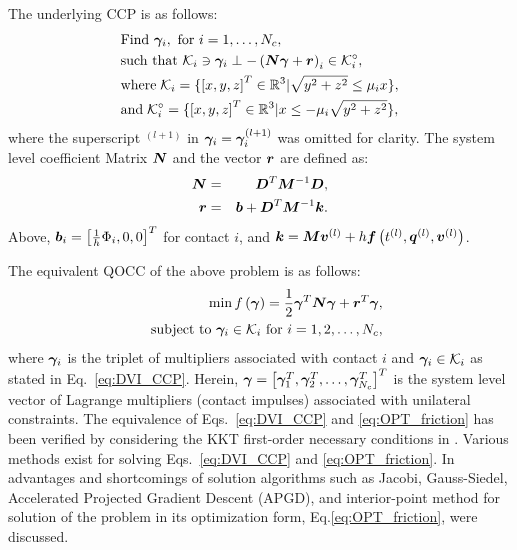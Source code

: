 The underlying CCP is as follows:
\begin{align}\label{eq:DVI_CCP}
&\text{Find } \boldsymbol{\gamma}_i, \text{ for } i=1,\ldots,N_c \nonumber, \\
&\text{such that } {\mathcal{K}}_i \ni \boldsymbol{\gamma}_i\perp -\left(\boldsymbol{N}\boldsymbol{\gamma}+\boldsymbol{r}\right)_i \in {\mathcal{K}}_i^\circ ,\\
&\text{where}\; {\mathcal{K}}_i=\{\left[x,y,z\right]^T \in \mathbb{R}^3 | \sqrt{y^2+z^2} \leq \mu_i x\} \nonumber,\\
&\text{and}\; {\mathcal{K}}_i^\circ=\{\left[x,y,z\right]^T \in \mathbb{R}^3 | x \leq -\mu_i\sqrt{y^2+z^2}\}, \nonumber
\end{align}
where the superscript $^{(l+1)}$ in $\boldsymbol{\gamma}_i=\boldsymbol{\gamma}_i^{(l+1)}$ was omitted for clarity. The system level coefficient Matrix $\boldsymbol{N}$ and the vector $\boldsymbol{r}$ are defined as:
\begin{eqnarray}
\boldsymbol{N}&=&\boldsymbol{D}^T\boldsymbol{M}^{-1}\boldsymbol{D}, \\
\boldsymbol{r}&=&\boldsymbol{b}+\boldsymbol{D}^T\boldsymbol{M}^{-1}\boldsymbol{k}.
\end{eqnarray}
Above,  $\boldsymbol{b}_i = \left[\frac{1}{h}\Phi_i,0,0\right]^T$ for contact $i$, and $\boldsymbol{k}=\boldsymbol{M}\boldsymbol{v}^{(l)}+h \boldsymbol{f}\left(t^{(l)},\boldsymbol{q}^{(l)},\boldsymbol{v}^{(l)}\right)$.

\noindent
The equivalent QOCC of the above problem is as follows:
\begin{eqnarray}\label{eq:DVI_QOCC}
&&\min f\left(\boldsymbol{\gamma}\right) = \frac{1}{2}\boldsymbol{\gamma}^T \boldsymbol{N} \boldsymbol{\gamma}+\boldsymbol{r}^T \boldsymbol{\gamma} \label{eq:OPT_friction},\\
&&\text{subject to } \boldsymbol{\gamma}_i \in {\mathcal{K}}_i \text{ for } i=1,2,\ldots,N_c, \nonumber
\end{eqnarray}
\noindent
where $\boldsymbol{\gamma}_i$ is the triplet of multipliers associated with contact $i$ and $\boldsymbol{\gamma}_i\in{\mathcal{K}}_i$  as stated in Eq.~\ref{eq:DVI_CCP}.
Herein,  $\boldsymbol{\gamma}=\left[\boldsymbol{\gamma}_1^T,\boldsymbol{\gamma}_2^T,\ldots,\boldsymbol{\gamma}_{N_c}^T\right]^T$ is the system level vector of Lagrange multipliers (contact impulses) associated with unilateral constraints. The equivalence of Eqs.~\ref{eq:DVI_CCP} and \ref{eq:OPT_friction} has been verified by considering the KKT first-order necessary conditions in \cite{heynPhDThesis2013}. Various methods exist for solving Eqs.~\ref{eq:DVI_CCP} and \ref{eq:OPT_friction}. In \cite{heynPhDThesis2013} advantages and shortcomings of solution algorithms such as Jacobi, Gauss-Siedel, Accelerated Projected Gradient Descent (APGD), and interior-point method for solution of the problem in its optimization form, Eq.\ref{eq:OPT_friction}, were discussed.


